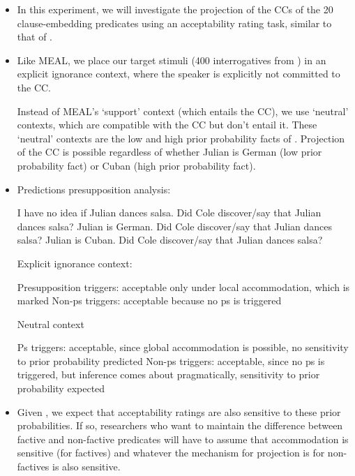 \documentclass[11pt,fleqn]{article}
\newcommand{\6}{\mbox{$[\hspace*{-.6mm}[$}}
\newcommand{\9}{\mbox{$]\hspace*{-.6mm}]$}}
\begin{document}
\begin{itemize}

\item In this experiment, we will investigate the projection of the CCs of the 20 clause-embedding predicates using an acceptability rating task, similar to that of \citealt{mandelkern-etal2020}. 

\item Like MEAL, we place our target stimuli (400 interrogatives from \citealt{degen-tonhauser-openmind, degen-tonhauser-language}) in an explicit ignorance context, where the speaker is explicitly not committed to the CC. 

Instead of MEAL's `support' context (which entails the CC), we use `neutral' contexts, which are compatible with the CC but don't entail it. These `neutral' contexts are the low and high prior probability facts of \citealt{degen-tonhauser-openmind}. Projection of the CC is possible regardless of whether Julian is German (low prior probability fact) or Cuban (high prior probability fact).

\item Predictions presupposition analysis:

\begin{exe}
\ex
\begin{xlist}
\ex I have no idea if Julian dances salsa. Did Cole discover/say that Julian dances salsa?
\ex Julian is German. Did Cole discover/say that Julian dances salsa?
\ex Julian is Cuban. Did Cole discover/say that Julian dances salsa?
\end{xlist}
\end{exe}

\begin{exe}
\ex Explicit ignorance context:
\begin{xlist}
\ex Presupposition triggers: acceptable only under local accommodation, which is marked
\ex Non-ps triggers: acceptable because no ps is triggered
\end{xlist}
\ex Neutral context
\begin{xlist}
\ex Ps triggers: acceptable, since global accommodation is possible, no sensitivity to prior probability predicted
\ex Non-ps triggers: acceptable, since no ps is triggered, but inference comes about pragmatically, sensitivity to prior probability expected
\end{xlist}
\end{exe}

\item Given \citealt{degen-tonhauser-openmind}, we expect that acceptability ratings are also sensitive to these prior probabilities. If so, researchers who want to maintain the difference between factive and non-factive predicates will have to assume that accommodation is sensitive (for factives) and whatever the mechanism for projection is for non-factives is also sensitive.


\end{itemize}
\end{document}
